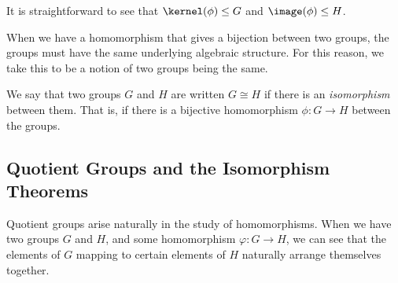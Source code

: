 It is straightforward to see that $\kernel(\phi) \leq G$ and $\image(\phi) \leq H$.

When we have a homomorphism that gives a bijection between two groups, the groups must have the same underlying algebraic structure. For this reason, we take this to be a notion of two groups being the same.

\begin{definition}[Isomorphism]
  We say that two groups $G$ and $H$ are  written $G \cong H$ if there is an \emph{isomorphism} between them. That is, if there is a bijective homomorphism $\phi: G \rightarrow H$ between the groups.  
\end{definition}



\subsection{Quotient Groups and the Isomorphism Theorems}


Quotient groups arise naturally in the study of homomorphisms. When we have two groups $G$ and $H$, and some homomorphism $\varphi: G \rightarrow H$, we can see that the elements of $G$ mapping to certain elements of $H$ naturally arrange themselves together.

